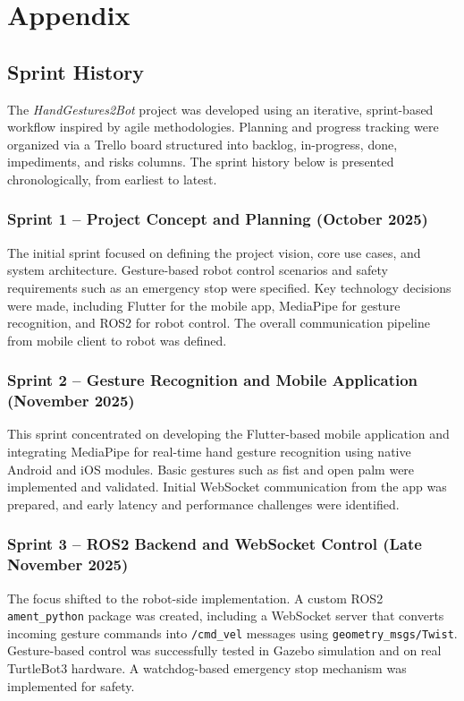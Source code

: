 \documentclass[11pt,a4paper]{article}
\begin{document}
\newpage
\appendix
\section{Appendix}

\subsection{Sprint History}

The \textit{HandGestures2Bot} project was developed using an iterative, sprint-based workflow inspired by agile methodologies. Planning and progress tracking were organized via a Trello board structured into backlog, in-progress, done, impediments, and risks columns. The sprint history below is presented chronologically, from earliest to latest.

\subsubsection{Sprint 1 -- Project Concept and Planning (October 2025)}
The initial sprint focused on defining the project vision, core use cases, and system architecture. Gesture-based robot control scenarios and safety requirements such as an emergency stop were specified. Key technology decisions were made, including Flutter for the mobile app, MediaPipe for gesture recognition, and ROS2 for robot control. The overall communication pipeline from mobile client to robot was defined.

\subsubsection{Sprint 2 -- Gesture Recognition and Mobile Application (November 2025)}
This sprint concentrated on developing the Flutter-based mobile application and integrating MediaPipe for real-time hand gesture recognition using native Android and iOS modules. Basic gestures such as fist and open palm were implemented and validated. Initial WebSocket communication from the app was prepared, and early latency and performance challenges were identified.

\subsubsection{Sprint 3 -- ROS2 Backend and WebSocket Control (Late November 2025)}
The focus shifted to the robot-side implementation. A custom ROS2 \texttt{ament\_python} package was created, including a WebSocket server that converts incoming gesture commands into \texttt{/cmd\_vel} messages using \texttt{geometry\_msgs/Twist}. Gesture-based control was successfully tested in Gazebo simulation and on real TurtleBot3 hardware. A watchdog-based emergency stop mechanism was implemented for safety.
\end{document}
